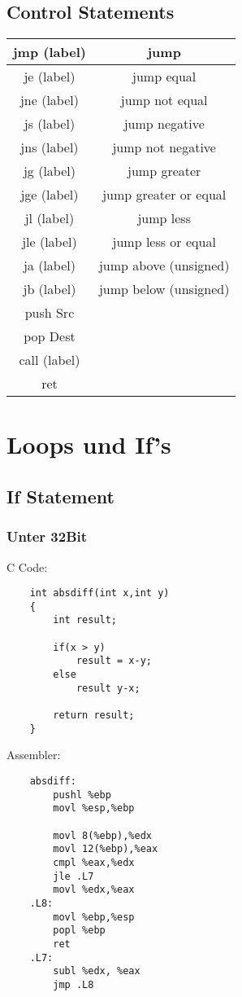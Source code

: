 \documentclass[a4paper, 11pt]{article}
\begin{document}
\subsection{Control Statements}
\begin{tabular}{|c|c|}
	\hline
	jmp (label) & jump \\\hline
	je (label) & jump equal \\\hline
	jne (label) & jump not equal  \\\hline
	js (label) & jump negative \\\hline
	jns (label) & jump not negative  \\\hline
	jg (label) & jump greater \\\hline
	jge (label) & jump greater or equal \\\hline
	jl (label) & jump less  \\\hline
	jle (label) & jump less or equal \\\hline
	ja (label) & jump above (unsigned) \\\hline
	jb (label) & jump below (unsigned) \\\hline
	push Src &  \\\hline
	pop Dest & \\\hline
	call (label) &  \\\hline
	ret &  \\\hline
\end{tabular}

\section{Loops und If's}

\subsection{If Statement}
\subsubsection{Unter 32Bit}
C Code:
\begin{lstlisting}
	int absdiff(int x,int y)
	{
		int result;
		
		if(x > y)
			result = x-y;
		else
			result y-x;
			
		return result;
	}
\end{lstlisting}

Assembler:
\begin{lstlisting}
	absdiff:
		pushl %ebp
		movl %esp,%ebp
		
		movl 8(%ebp),%edx
		movl 12(%ebp),%eax
		cmpl %eax,%edx
		jle .L7			 
		movl %edx,%eax 
	.L8:
		movl %ebp,%esp
		popl %ebp
		ret
	.L7:
		subl %edx, %eax
		jmp .L8
\end{lstlisting}
\end{document}
